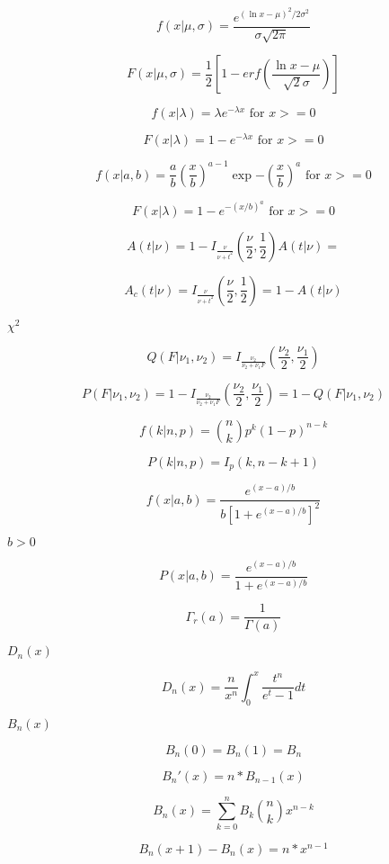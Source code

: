 \documentclass{article}
\begin{document}
\[ f(x|\mu,\sigma) = \frac{e^{(\ln{x}-\mu)^2/2\sigma^2}}{\sigma\sqrt{2\pi}} \]
\pagebreak

\[ F(x|\mu,\sigma) = \frac{1}{2}\left[ 1-erf(\frac{\ln{x}-\mu}{\sqrt{2}\sigma}) \right] \]
\pagebreak

\[ f(x|\lambda) = \lambda e^{-\lambda x} \mbox{ for } x >= 0 \]
\pagebreak

\[ F(x|\lambda) = 1 - e^{-\lambda x} \mbox{ for } x >= 0 \]
\pagebreak

\[ f(x | a, b) = \frac{a}{b} \left(\frac{x}{b} \right)^{a-1} \exp{-\left(\frac{x}{b}\right)^a} \mbox{ for } x >= 0 \]
\pagebreak

\[ F(x|\lambda) = 1 - e^{-(x / b)^a} \mbox{ for } x >= 0 \]
\pagebreak

\[ A(t|\nu) = 1 - I_{\frac{\nu}{\nu + t^2}}(\frac{\nu}{2}, \frac{1}{2}) A(t|\nu) = \]
\pagebreak

\[ A_c(t|\nu) = I_{\frac{\nu}{\nu + t^2}}(\frac{\nu}{2}, \frac{1}{2}) = 1 - A(t|\nu) \]
\pagebreak

$ \chi^2 $
\pagebreak

\[ Q(F|\nu_1, \nu_2) = I_{\frac{\nu_2}{\nu_2 + \nu_1 F}} (\frac{\nu_2}{2}, \frac{\nu_1}{2}) \]
\pagebreak

\[ P(F|\nu_1, \nu_2) = 1 - I_{\frac{\nu_2}{\nu_2 + \nu_1 F}} (\frac{\nu_2}{2}, \frac{\nu_1}{2}) = 1 - Q(F|\nu_1, \nu_2) \]
\pagebreak

\[ f(k|n,p) = \binom{n}{k}p^k(1-p)^{n-k} \]
\pagebreak

\[ P(k|n,p) = I_p(k, n-k+1) \]
\pagebreak

\[ f(x| a, b) = \frac{e^{(x - a)/b}}{b[1 + e^{(x - a)/b}]^2} \]
\pagebreak

$b > 0$
\pagebreak

\[ P(x| a, b) = \frac{e^{(x - a)/b}}{1 + e^{(x - a)/b}} \]
\pagebreak

\[ \Gamma_r(a) = \frac{1}{\Gamma(a)} \]
\pagebreak

$ D_n(x) $
\pagebreak

\[ D_n(x) = \frac{n}{x^n}\int_{0}^{x}\frac{t^n}{e^t-1}dt \]
\pagebreak

$ B_n(x) $
\pagebreak

\[ B_n(0) = B_n(1) = B_n \]
\pagebreak

\[ B_n'(x) = n * B_{n-1}(x) \]
\pagebreak

\[ B_n(x) = \sum_{k=0}^{n} B_k \binom{n}{k} x^{n-k} \]
\pagebreak

\[ B_n(x+1) - B_n(x) = n * x^{n-1} \]
\pagebreak
\end{document}
